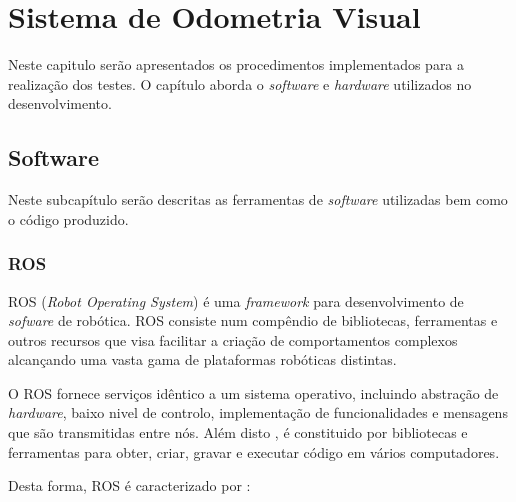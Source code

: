 \chapter{Sistema de Odometria Visual} \label{chap:sist}

Neste capitulo serão apresentados os procedimentos implementados para a realização dos testes. O capítulo aborda o \textit{software} e \textit{hardware} utilizados no desenvolvimento.

\section{Software}

Neste subcapítulo serão descritas as ferramentas de \textit{software} utilizadas bem como o código produzido.

\subsection{ROS}

ROS (\textit{Robot Operating System}) é uma \textit{framework} para desenvolvimento de \textit{sofware} de robótica. ROS consiste num compêndio de bibliotecas, ferramentas e outros recursos que visa facilitar a criação de comportamentos complexos alcançando uma vasta gama de plataformas robóticas distintas. 

O ROS fornece serviços idêntico a um sistema operativo, incluindo abstração de \textit{hardware}, baixo nivel de controlo, implementação de funcionalidades e mensagens que são transmitidas entre nós. Além disto , é constituido por bibliotecas e ferramentas para obter, criar, gravar e executar código em vários computadores. 

Desta forma, ROS  é caracterizado por :

